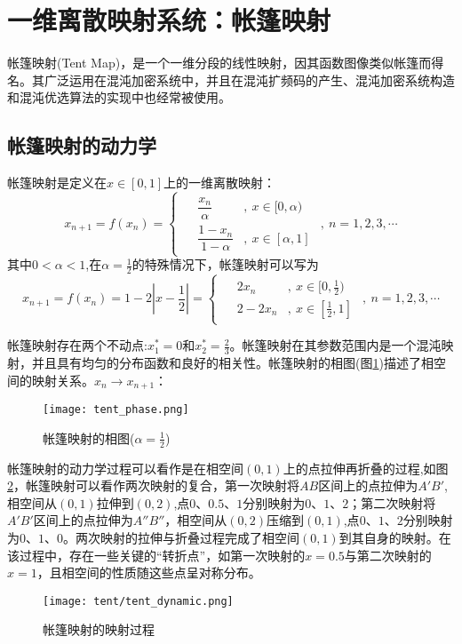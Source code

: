 \section{一维离散映射系统：帐篷映射}
帐篷映射\cite{yoshida1983analytic}(Tent Map)，是一个一维分段的线性映射，因其函数图像类似帐篷而得名。其广泛运用在混沌加密系统中，并且在混沌扩频码的产生、混沌加密系统构造和混沌优选算法的实现中也经常被使用。

\subsection{帐篷映射的动力学}

帐篷映射是定义在$x\in [0,1]$上的一维离散映射：
\begin{equation}
    x_{n+1}=f(x_n)=
    \begin{cases}
        \begin{aligned}
            &\dfrac{x_n}{\alpha}&,\ x\in [0,\alpha)\\
            &\dfrac{1-x_n}{1-\alpha}&,\ x\in [\alpha,1]
        \end{aligned}
    \end{cases},\ n=1,2,3,\cdots
\end{equation}
其中$0<\alpha<1$,在$\alpha=\frac{1}{2}$的特殊情况下，帐篷映射可以写为
\begin{equation}
    x_{n+1}=f(x_n)=1-2|x-\frac{1}{2}|=
    \begin{cases}
        \begin{aligned}
            &2x_n&,\ x\in [0,\frac{1}{2})\\
            &2-2x_n&,\ x\in [\frac{1}{2},1]
        \end{aligned}
    \end{cases},\ n=1,2,3,\cdots
\end{equation}

帐篷映射存在两个不动点:$x_1^*=0$和$x_2^*=\frac{2}{3}$。帐篷映射在其参数范围内是一个混沌映射，并且具有均匀的分布函数和良好的相关性。帐篷映射的相图(图\ref{fig:tent_pha})描述了相空间的映射关系。$x_n\rightarrow x_{n+1}$：
\begin{figure}[!]
	\centering
	\texttt{[image: tent\_phase.png]}
    \caption{帐篷映射的相图($\alpha=\frac{1}{2}$)}
    \label{fig:tent_pha}
\end{figure}

帐篷映射的动力学过程可以看作是在相空间$(0,1)$上的点拉伸再折叠的过程,如图\ref{fig:tent_dyna}，帐篷映射可以看作两次映射的复合，第一次映射将$AB$区间上的点拉伸为$A'B'$,相空间从$(0,1)$拉伸到$(0,2)$,点$0$、$0.5$、$1$分别映射为$0$、$1$、$2$；第二次映射将$A'B'$区间上的点拉伸为$A''B''$，相空间从$(0,2)$压缩到$(0,1)$,点$0$、$1$、$2$分别映射为$0$、$1$、$0$。两次映射的拉伸与折叠过程完成了相空间$(0,1)$到其自身的映射。在该过程中，存在一些关键的“转折点”，如第一次映射的$x=0.5$与第二次映射的$x=1$，且相空间的性质随这些点呈对称分布。
\begin{figure}[!]
	\centering
	\texttt{[image: tent/tent\_dynamic.png]}
    \caption{帐篷映射的映射过程}
    \label{fig:tent_dyna}
\end{figure}


